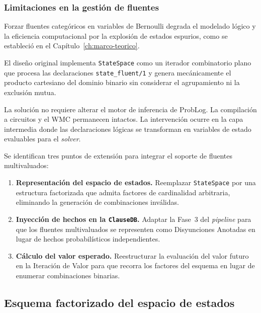 \subsubsection{Limitaciones en la gestión de fluentes}
\label{sec:di-limitaciones-gestion}

Forzar fluentes categóricos en variables de Bernoulli degrada el modelado
lógico y la eficiencia computacional por la explosión de estados espurios,
como se estableció en el Capítulo~\ref{ch:marco-teorico}.

El diseño original implementa \texttt{StateSpace} como un iterador combinatorio
plano que procesa las declaraciones \texttt{state\_fluent/1} y genera
mecánicamente el producto cartesiano del dominio binario sin considerar el
agrupamiento ni la exclusión mutua.

La solución no requiere alterar el motor de inferencia de ProbLog. La
compilación a circuitos y el WMC permanecen intactos. La intervención ocurre
en la capa intermedia donde las declaraciones lógicas se transforman en
variables de estado evaluables para el \textit{solver}.

Se identifican tres puntos de extensión para integrar el soporte de fluentes
multivaluados:

\begin{enumerate}
    \item \textbf{Representación del espacio de estados.} Reemplazar \texttt{StateSpace}
        por una estructura factorizada que admita factores de cardinalidad arbitraria,
        eliminando la generación de combinaciones inválidas.

    \item \textbf{Inyección de hechos en la \texttt{ClauseDB}.} Adaptar la Fase~3
        del \textit{pipeline} para que los fluentes multivaluados se representen como
        Disyunciones Anotadas en lugar de hechos probabilísticos independientes.

    \item \textbf{Cálculo del valor esperado.} Reestructurar la evaluación del valor
        futuro en la Iteración de Valor para que recorra los factores del esquema en
        lugar de enumerar combinaciones binarias.
\end{enumerate}

\subsection{Esquema factorizado del espacio de estados}
\label{sec:di-fluentschema}

